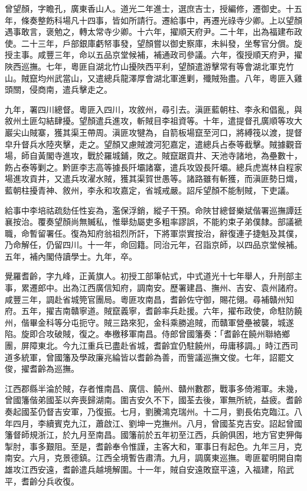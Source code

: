 \begin{pinyinscope}
曾望顏，字瞻孔，廣東香山人。道光二年進士，選庶吉士，授編修，遷御史。十五年，條奏整飭科場凡十四事，皆如所請行。遷給事中，再遷光祿寺少卿。上以望顏遇事敢言，褒勉之，轉太常寺少卿。十六年，擢順天府尹。二十年，出為福建布政使。二十三年，戶部銀庫虧帑事發，望顏嘗以御史察庫，未糾發，坐奪官分償。旋授主事。咸豐三年，命以五品京堂候補，補通政司參議。六年，復授順天府尹，擢陜西巡撫。七年，粵匪自湖北竹山擾陜西平利，望顏遣游擊常有等會湖北軍克竹山。賊竄均州武當山，又遣總兵龍澤厚會湖北軍進剿，殲賊殆盡。八年，粵匪入雞頭關，侵商南，遣兵擊走之。

九年，署四川總督。粵匪入四川，攻敘州，尋引去。滇匪藍朝柱、李永和倡亂，與敘州土匪勾結肆擾。望顏遣兵進攻，斬賊目李祖資等。十年，遣提督孔廣順等攻大巖尖山賊寨，獲其渠王帶周。滇匪攻犍為，自箭板場竄至河口，將縛筏以渡，提督皁升督兵水陸夾擊，走之。望顏又慮賊渡河犯嘉定，遣總兵占泰等截擊。賊據觀音場，師自黃閣寺進攻，戰於羅城鋪，敗之。賊竄踞貢井、天池寺諸地，為壘數十，飭占泰等剿之。黔匪李志高等據長阡壩諸寨，遣兵攻毀長阡壩。總兵虎嵩林自程家場進攻貢井，又遣兵攻濯水賊，獲其渠賀世愚等。諸路雖有斬獲，而滇匪勢日熾，藍朝柱擾青神、敘州，李永和攻嘉定，省城戒嚴。詔斥望顏不能制賊，下吏議。

給事中李培祜疏劾任性妄為，濫保浮銷，縱子干預。命陜甘總督樂斌偕署巡撫譚廷襄按治。覆奏望顏尚無贓私，惟舉劾屬吏多粗率謬誤，不能約束子弟僕隸。部議褫職，命暫留署任。復為知府翁祖烈所訐，下將軍崇實按治，辭復連子捷魁及其僕，乃命解任，仍留四川。十一年，命回籍。同治元年，召詣京師，以四品京堂候補。五年，補內閣侍讀學士。九年，卒。

覺羅耆齡，字九峰，正黃旗人。初授工部筆帖式，中式道光十七年舉人，升刑部主事，累遷郎中。出為江西廣信知府，調南安。歷署建昌、撫州、吉安、袁州諸府。咸豐三年，調赴省城筦官團局。粵匪攻南昌，耆齡佐守御，賜花翎。尋補贛州知府。五年，擢吉南贛寧道。賊竄義寧，耆齡率兵赴援。六年，擢布政使，命駐防饒州，偕畢金科等分屯扼守。賊三路來犯，金科乘勝追賊，而贛軍營壘被襲，城遂陷。旋即合攻破賊，復之。奉檄移軍南昌。侍郎曾國籓奏：「耆齡在饒州聯絡鄉團，屏障東北。今九江重兵已盡赴省城，耆齡宜仍駐饒州，毋庸移調。」時江西司道多統軍，曾國籓及學政廉兆綸皆以耆齡為善，而訾議巡撫文俊。七年，詔罷文俊，擢耆齡為巡撫。

江西郡縣半淪於賊，存者惟南昌、廣信、饒州、贛州數郡，戰事多倚湘軍。未幾，曾國籓偕弟國荃以奔喪歸湖南。圍吉安久不下，國荃去後，軍無所統，益疲。耆齡奏起國荃仍督吉安軍，乃復振。七月，劉騰鴻克瑞州。十二月，劉長佑克臨江。八年四月，李續賓克九江，蕭啟江、劉坤一克撫州。八月，曾國荃克吉安。詔起曾國籓督師規浙江，於九月至南昌。國籓前於五年初至江西，兵餉俱困，地方官吏狎侮掣肘，事多艱阻。至是，耆齡奉令惟謹，主客大和，軍事日有起色。九年三月，克南安。六月，克景德鎮。江西全境暫告肅清。九月，調廣東巡撫。粵匪翟明開自南雄攻江西安遠，耆齡遣兵越境解圍。十一年，賊自安遠敗竄平遠，入福建，陷武平，耆齡分兵收復。


\end{pinyinscope}
